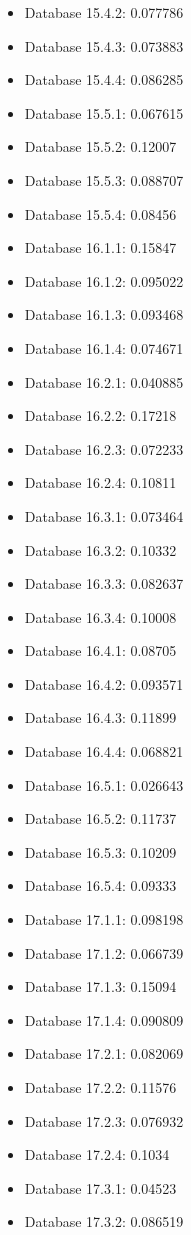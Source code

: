 \begin{itemize}
\item Database 15.4.2: 0.077786
\item Database 15.4.3: 0.073883
\item Database 15.4.4: 0.086285
\item Database 15.5.1: 0.067615
\item Database 15.5.2: 0.12007
\item Database 15.5.3: 0.088707
\item Database 15.5.4: 0.08456
\item Database 16.1.1: 0.15847
\item Database 16.1.2: 0.095022
\item Database 16.1.3: 0.093468
\item Database 16.1.4: 0.074671
\item Database 16.2.1: 0.040885
\item Database 16.2.2: 0.17218
\item Database 16.2.3: 0.072233
\item Database 16.2.4: 0.10811
\item Database 16.3.1: 0.073464
\item Database 16.3.2: 0.10332
\item Database 16.3.3: 0.082637
\item Database 16.3.4: 0.10008
\item Database 16.4.1: 0.08705
\item Database 16.4.2: 0.093571
\item Database 16.4.3: 0.11899
\item Database 16.4.4: 0.068821
\item Database 16.5.1: 0.026643
\item Database 16.5.2: 0.11737
\item Database 16.5.3: 0.10209
\item Database 16.5.4: 0.09333
\item Database 17.1.1: 0.098198
\item Database 17.1.2: 0.066739
\item Database 17.1.3: 0.15094
\item Database 17.1.4: 0.090809
\item Database 17.2.1: 0.082069
\item Database 17.2.2: 0.11576
\item Database 17.2.3: 0.076932
\item Database 17.2.4: 0.1034
\item Database 17.3.1: 0.04523
\item Database 17.3.2: 0.086519

\end{itemize}
